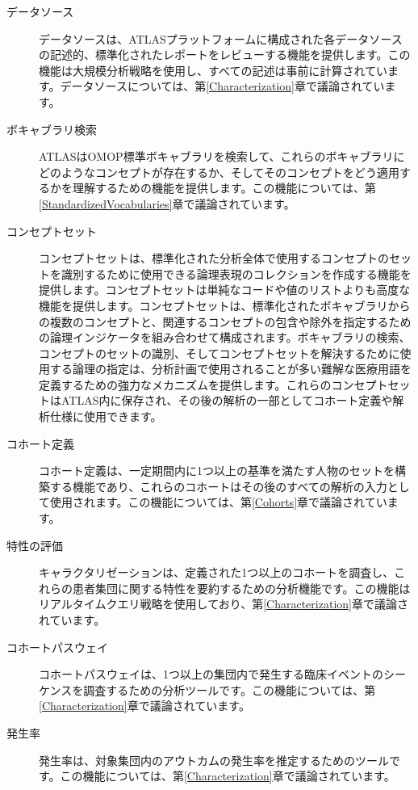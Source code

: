 \documentclass[
  11pt]{book}
\theoremstyle{definition}
\theoremstyle{definition}
\theoremstyle{definition}
\theoremstyle{definition}
\theoremstyle{remark}
\begin{document}
\begin{description}
\item[データソース  ]
データソースは、ATLASプラットフォームに構成された各データソースの記述的、標準化されたレポートをレビューする機能を提供します。この機能は大規模分析戦略を使用し、すべての記述は事前に計算されています。データソースについては、第\ref{Characterization}章で議論されています。
\item[ボキャブラリ検索 ]
ATLASはOMOP標準ボキャブラリを検索して、これらのボキャブラリにどのようなコンセプトが存在するか、そしてそのコンセプトをどう適用するかを理解するための機能を提供します。この機能については、第\ref{StandardizedVocabularies}章で議論されています。
\item[コンセプトセット ]
コンセプトセットは、標準化された分析全体で使用するコンセプトのセットを識別するために使用できる論理表現のコレクションを作成する機能を提供します。コンセプトセットは単純なコードや値のリストよりも高度な機能を提供します。コンセプトセットは、標準化されたボキャブラリからの複数のコンセプトと、関連するコンセプトの包含や除外を指定するための論理インジケータを組み合わせて構成されます。ボキャブラリの検索、コンセプトのセットの識別、そしてコンセプトセットを解決するために使用する論理の指定は、分析計画で使用されることが多い難解な医療用語を定義するための強力なメカニズムを提供します。これらのコンセプトセットはATLAS内に保存され、その後の解析の一部としてコホート定義や解析仕様に使用できます。
\item[コホート定義 ]
コホート定義は、一定期間内に1つ以上の基準を満たす人物のセットを構築する機能であり、これらのコホートはその後のすべての解析の入力として使用されます。この機能については、第\ref{Cohorts}章で議論されています。
\item[特性の評価]
キャラクタリゼーションは、定義された1つ以上のコホートを調査し、これらの患者集団に関する特性を要約するための分析機能です。この機能はリアルタイムクエリ戦略を使用しており、第\ref{Characterization}章で議論されています。
\item[コホートパスウェイ ]
コホートパスウェイは、1つ以上の集団内で発生する臨床イベントのシーケンスを調査するための分析ツールです。この機能については、第\ref{Characterization}章で議論されています。
\item[発生率 ]
発生率は、対象集団内のアウトカムの発生率を推定するためのツールです。この機能については、第\ref{Characterization}章で議論されています。

\end{description}
\end{document}

